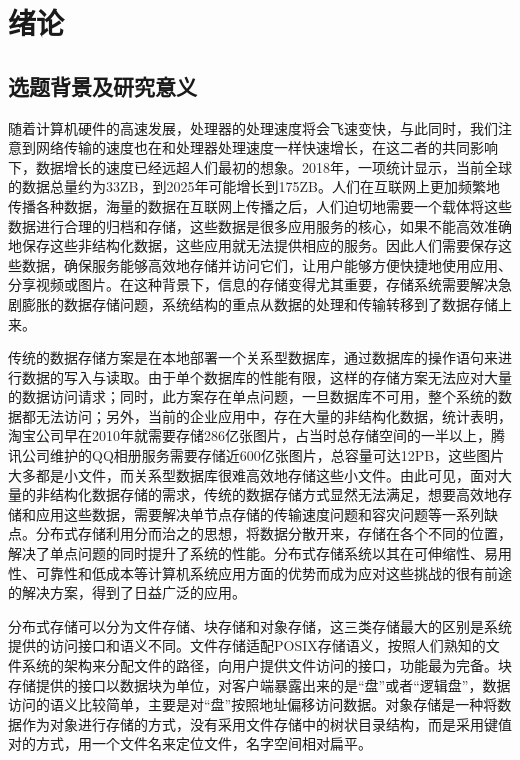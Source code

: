 
\chapter{绪论}

\section{选题背景及研究意义}%
随着计算机硬件的高速发展，处理器的处理速度将会飞速变快，与此同时，我们注意到网络传输的速度也在和处理器处理速度一样快速增长，在这二者的共同影响下，数据增长的速度已经远超人们最初的想象。2018年，一项统计显示，当前全球的数据总量约为33ZB，到2025年可能增长到175ZB\cite{1}。人们在互联网上更加频繁地传播各种数据，海量的数据在互联网上传播之后，人们迫切地需要一个载体将这些数据进行合理的归档和存储，这些数据是很多应用服务的核心，如果不能高效准确地保存这些非结构化数据，这些应用就无法提供相应的服务\cite{2}。因此人们需要保存这些数据，确保服务能够高效地存储并访问它们，让用户能够方便快捷地使用应用、分享视频或图片。在这种背景下，信息的存储变得尤其重要，存储系统需要解决急剧膨胀的数据存储问题，系统结构的重点从数据的处理和传输转移到了数据存储上来。

传统的数据存储方案是在本地部署一个关系型数据库，通过数据库的操作语句来进行数据的写入与读取。由于单个数据库的性能有限，这样的存储方案无法应对大量的数据访问请求；同时，此方案存在单点问题，一旦数据库不可用，整个系统的数据都无法访问；另外，当前的企业应用中，存在大量的非结构化数据，统计表明，淘宝公司早在2010年就需要存储286亿张图片\cite{3}，占当时总存储空间的一半以上，腾讯公司维护的QQ相册服务需要存储近600亿张图片，总容量可达12PB\cite{4}，这些图片大多都是小文件，而关系型数据库很难高效地存储这些小文件。由此可见，面对大量的非结构化数据存储的需求，传统的数据存储方式显然无法满足，想要高效地存储和应用这些数据，需要解决单节点存储的传输速度问题和容灾问题等一系列缺点\cite{5}。分布式存储利用分而治之的思想，将数据分散开来，存储在各个不同的位置，解决了单点问题的同时提升了系统的性能。分布式存储系统以其在可伸缩性、易用性、可靠性和低成本等计算机系统应用方面的优势而成为应对这些挑战的很有前途的解决方案，得到了日益广泛的应用\cite{6}。

分布式存储可以分为文件存储、块存储和对象存储，这三类存储最大的区别是系统提供的访问接口和语义不同。文件存储适配POSIX存储语义，按照人们熟知的文件系统的架构来分配文件的路径，向用户提供文件访问的接口，功能最为完备。块存储提供的接口以数据块为单位，对客户端暴露出来的是“盘”或者“逻辑盘”，数据访问的语义比较简单，主要是对“盘”按照地址偏移访问数据。对象存储是一种将数据作为对象进行存储的方式，没有采用文件存储中的树状目录结构，而是采用键值对的方式，用一个文件名来定位文件，名字空间相对扁平。

